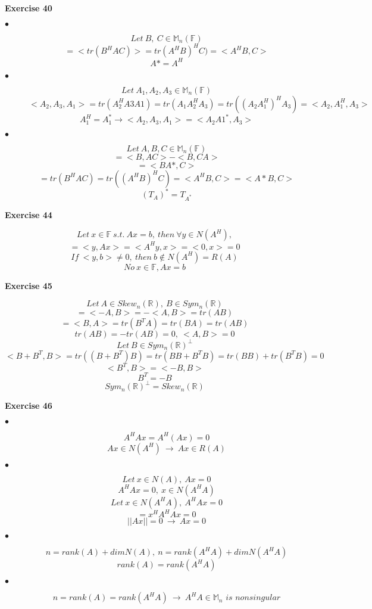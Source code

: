 \documentclass[letterpaper,12pt]{article}
\theoremstyle{definition}
\begin{document}
\noindent\textbf{Exercise 40} 
\begin{description}
\item [$\bullet$] \[Let \ B, \ C \in \mathbb{M}_n(\mathbb{F})\] 
\[<B, AC> = <tr(B^HAC)> = tr(A^HB)^HC) = <A^HB, C>\]
\[A* = A^H\]
\item [$\bullet$] \[Let \ A_1, A_2, A_3 \in \mathbb{M}_n(\mathbb{F})\]
\[<A_2, A_3, A_1> = tr(A_2^HA3A1) = tr(A_1A_2^HA_3) = tr((A_2A_1^H)^HA_3) = <A_2, A_1^H, A_3>\]
\[A_1^H = A_1^* \rightarrow <A_2, A_3, A_1> = <A_2A1^*,A_3>\]
\item [$\bullet$] \[Let \ A, B, C \in \mathbb{M}_n(\mathbb{F})\]
\[<B, AC - CA> = <B, AC> - <B, CA>\]
\[<B, CA> = <BA*, C>\]
\[<B, AC> = tr(B^HAC) = tr((A^HB)^HC) = <A^HB, C> = <A*B, C>\]
\[(T_A)^* = T_{A^*}\]
\end{description}

\noindent\textbf{Exercise 44} 
\begin{description}
\item \[Let \ x \in \mathbb{F} \ s.t. \ Ax = b, \ then \ \forall y \in N(A^H),\]
\[<y, b> = <y, Ax> = <A^Hy, x> = <0, x> = 0\]
\[If \ <y, b> \neq 0, \ then \ b \not\in N(A^H) = R(A)\]
\[No \ x \in \mathbb{F}, Ax = b\]
\end{description}

\noindent\textbf{Exercise 45} 
\begin{description}
\item \[Let \ A \in Skew_n(\mathbb{R}), \ B \in Sym_n(\mathbb{R})\]
\[<A, B> = <-A, B> = -<A, B> = tr(AB)\]
\[<A, B> = <B, A> = tr(B^TA) = tr(BA) = tr(AB) \]
\[tr(AB) = -tr(AB) = 0, \ <A, B> = 0\]
\[Let \ B \in Sym_n(\mathbb{R})^\perp\]
\[<B + B^T, B> = tr((B + B^T)B) = tr(BB + B^TB) = tr(BB) + tr(B^TB) = 0\]
\[<B^T, B> = <-B, B>\]
\[B^T = -B\]
\[Sym_n(\mathbb{R})^\perp = Skew_n(\mathbb{R})\]
\end{description}

\noindent\textbf{Exercise 46} 
\begin{description}
\item [$\bullet$] \[A^HAx = A^H(Ax) = 0\]
\[Ax \in N(A^H) \ \rightarrow \ Ax \in R(A) \]
\item [$\bullet$] \[Let \ x \in N(A), \ Ax = 0\]
\[A^HAx = 0, \ x \in N(A^HA)\]
\[Let \ x \in N(A^HA), \ A^HAx = 0\]
\[<Ax, Ax> = x^HA^HAx = 0\]
\[||Ax|| = 0 \ \rightarrow \ Ax = 0\]
\item [$\bullet$]\[n = rank(A) + dimN(A),  \ n = rank(A^HA) + dimN(A^HA)\] 
\[rank(A) = rank(A^HA)\]
\item [$\bullet$] \[n = rank(A) = rank(A^HA) \ \rightarrow \ A^HA \in \mathbb{M}_n\textit{ is nonsingular}\]
\end{description}
\end{document}
